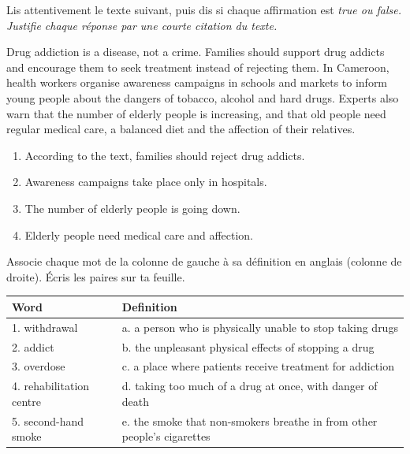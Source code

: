 \documentclass[11pt]{article}
\newcommand{\eng}[1]{\ifmmode\text{\textit{#1}}\else\begingroup\selectlanguage{english}\itshape #1\endgroup\fi}
\begin{document}
\begin{exercice}
Lis attentivement le texte suivant, puis dis si chaque affirmation est \eng{true} ou \eng{false}. Justifie chaque réponse par une courte citation du texte.
\begin{textebox}
Drug addiction is a disease, not a crime. Families should support drug addicts and encourage them to seek treatment instead of rejecting them. In Cameroon, health workers organise awareness campaigns in schools and markets to inform young people about the dangers of tobacco, alcohol and hard drugs. Experts also warn that the number of elderly people is increasing, and that old people need regular medical care, a balanced diet and the affection of their relatives.
\end{textebox}
\begin{enumerate}
\item According to the text, families should reject drug addicts.
\item Awareness campaigns take place only in hospitals.
\item The number of elderly people is going down.
\item Elderly people need medical care and affection.
\end{enumerate}
\end{exercice}

\begin{exercice}
Associe chaque mot de la colonne de gauche à sa définition en anglais (colonne de droite). Écris les paires sur ta feuille.
\begin{center}
\begin{tabularx}{\linewidth}{|l|X|}
\hline
\rowcolor{popblueL} \textbf{Word} & \textbf{Definition} \\
\hline
1. withdrawal & a. a person who is physically unable to stop taking drugs \\
\hline
2. addict & b. the unpleasant physical effects of stopping a drug \\
\hline
3. overdose & c. a place where patients receive treatment for addiction \\
\hline
4. rehabilitation centre & d. taking too much of a drug at once, with danger of death \\
\hline
5. second-hand smoke & e. the smoke that non-smokers breathe in from other people's cigarettes \\
\hline
\end{tabularx}
\end{center}
\end{exercice}
\end{document}
